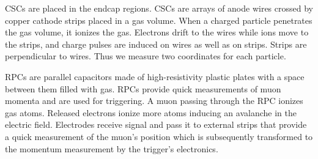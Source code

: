 CSCs are placed in the endcap regions. CSCs are arrays of anode wires crossed by copper cathode strips placed in a gas volume. When a charged particle penetrates the gas volume, it ionizes the gas. Electrons drift to the wires while ions move to the strips, and charge pulses are induced on wires as well as on strips. Strips are perpendicular to wires. Thus we measure two coordinates for each particle.  

RPCs are parallel capacitors made of high-resistivity plastic plates with a space between them filled with gas. RPCs provide quick measurements of muon momenta and are used for triggering. A muon passing through the RPC ionizes gas atoms. Released electrons ionize more atoms inducing an avalanche in the electric field. Electrodes receive signal and pass it to external strips that provide a quick measurement of the muon's position which is subsequently transformed to the momentum measurement by the trigger's electronics. 


